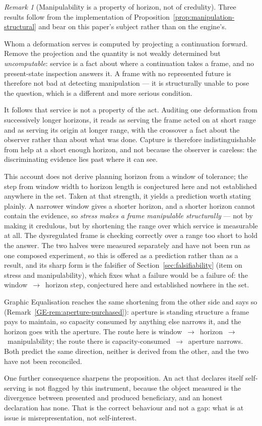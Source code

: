 \documentclass[11pt,a4paper]{article}
\theoremstyle{remark}\newtheorem{remark}[definition]{Remark}
\begin{document}
\begin{remark}[Manipulability is a property of horizon, not of credulity]\label{rem:comm-horizon}
Three results follow from the implementation of Proposition~\ref{prop:manipulation-structural} and
bear on this paper's subject rather than on the engine's.

Whom a deformation serves is computed by projecting a continuation forward. Remove the projection and
the quantity is not weakly determined but \emph{uncomputable}: service is a fact about where a
continuation takes a frame, and no present-state inspection answers it. A frame with no represented
future is therefore not bad at detecting manipulation --- it is structurally unable to pose the
question, which is a different and more serious condition.

It follows that service is not a property of the act. Auditing one deformation from successively
longer horizons, it reads as serving the frame acted on at short range and as serving its origin at
longer range, with the crossover a fact about the observer rather than about what was done. Capture
is therefore indistinguishable from help at a short enough horizon, and not because the observer is
careless: the discriminating evidence lies past where it can see.

This account does not derive planning horizon from a window of tolerance; the step from window
width to horizon length is conjectured here and not established anywhere in the set. Taken at that
strength, it yields a prediction worth stating plainly. A narrower window gives a shorter horizon,
and a shorter horizon cannot contain the evidence, so \emph{stress makes a frame manipulable
structurally} --- not by making it credulous, but by shortening the range over which service is
measurable at all. The dysregulated frame is checking correctly over a range too short to hold the
answer. The two halves were measured separately and have not been run as one composed experiment, so
this is offered as a prediction rather than as a result, and its sharp form is the falsifier of
Section~\ref{sec:falsifiability} (item on stress and manipulability), which fixes what a failure would
be a failure of: the window~$\to$~horizon step, conjectured here and established nowhere in the set.

Graphic Equalisation reaches the same shortening from the other side and says so
(Remark~\ref{GE-rem:aperture-purchased}): aperture is standing structure a frame pays to maintain,
so capacity consumed by anything else narrows it, and the horizon goes with the aperture. The route
here is window~$\to$~horizon~$\to$~manipulability; the route there is capacity-consumed~$\to$~aperture
narrows. Both predict the same direction, neither is derived from the other, and the two have not
been reconciled.

One further consequence sharpens the proposition. An act that declares itself self-serving is not
flagged by this instrument, because the object measured is the divergence between presented and
produced beneficiary, and an honest declaration has none. That is the correct behaviour and not a
gap: what is at issue is misrepresentation, not self-interest.
\end{remark}
\end{document}
